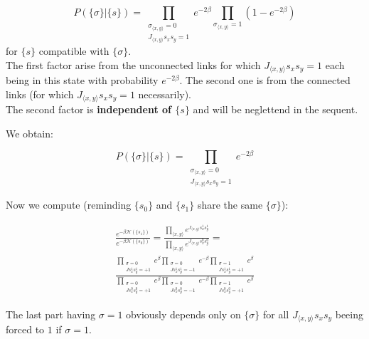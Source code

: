 \documentclass[12pt,handout]{beamer}
\begin{document}
\begin{frame}
\begin{center}

{\large
\[P \left( \lbrace \sigma \rbrace | \lbrace s \rbrace \right) =
\prod_{ \substack{ \sigma_{\langle x, y \rangle} = 0 \\ J_{\langle x, y \rangle} s_x s_y = 1}} e^{-2 \beta} \prod_{\sigma_{\langle x, y \rangle} = 1} \left( 1- e^{-2 \beta } \right)
\]} for $\lbrace s \rbrace$ compatible with $\lbrace \sigma \rbrace$.\\
\vspace{20pt}
The first factor arise from the unconnected links for which $J_{\langle x, y \rangle} s_x s_y = 1$ each being in this state with probability $e^{ - 2 \beta }$. The second one is from the connected links (for which $J_{\langle x, y \rangle} s_x s_y = 1$ necessarily).\\
\vspace{20pt}
The second factor is \textbf{independent of $\lbrace s \rbrace$} and will be neglettend in the sequent.

\end{center}
\end{frame}

\begin{frame}
\begin{center}

We obtain:

\[
P \left( \lbrace \sigma \rbrace | \lbrace s \rbrace \right) =
\prod_{ \substack{ \sigma_{\langle x, y \rangle} = 0 \\ J_{\langle x, y \rangle} s_x s_y = 1}} e^{-2 \beta}
\]

Now we compute (reminding $\lbrace s_0 \rbrace$ and $\lbrace s_1 \rbrace$ share the same $\lbrace \sigma \rbrace$):

\begin{gather*}
\frac{e^{- \beta \mathcal{H} \left( \lbrace s_1 \rbrace \right)}}{e^{- \beta \mathcal{H} \left( \lbrace s_0 \rbrace \right)}} = \frac{\prod_{\langle x, y \rangle} e^{J_{\langle x, y \rangle} s^1_x s^1_y}}{\prod_{\langle x, y \rangle} e^{J_{\langle x, y \rangle} s^0_x s^0_y}} = \\ \frac{\prod_{\substack{\sigma = 0 \\ J s^1_x s^1_y = +1}} e^{\beta} \prod_{\substack{\sigma = 0 \\ J s^1_x s^1_y = -1}} e^{-\beta} \prod_{\substack{\sigma = 1 \\ J s^1_x s^1_y = +1}} e^{\beta}}{\prod_{\substack{\sigma = 0 \\ J s^0_x s^0_y = +1}} e^{\beta} \prod_{\substack{\sigma = 0 \\ J s^0_x s^0_y = -1}} e^{-\beta} \prod_{\substack{\sigma = 1 \\ J s^0_x s^0_y = +1}} e^{\beta}}
\end{gather*}

The last part having $\sigma = 1$ obviously depends only on $\lbrace \sigma \rbrace$ for all $J_{\langle x, y \rangle} s_x s_y$ beeing forced to $1$ if $\sigma=1$.

\end{center}
\end{frame}
\end{document}

